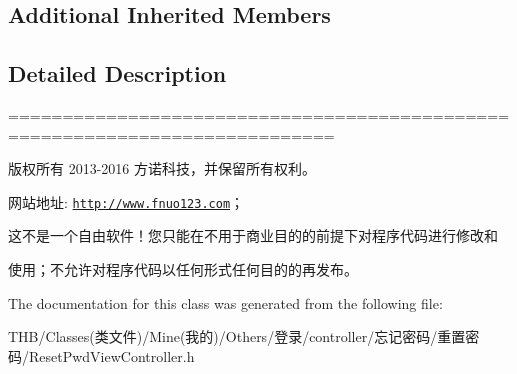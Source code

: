 \subsection*{Additional Inherited Members}


\subsection{Detailed Description}
============================================================================

版权所有 2013-\/2016 方诺科技，并保留所有权利。

网站地址\+: \href{http://www.fnuo123.com}{\tt http\+://www.\+fnuo123.\+com}； 



这不是一个自由软件！您只能在不用于商业目的的前提下对程序代码进行修改和

使用；不允许对程序代码以任何形式任何目的的再发布。 

 

The documentation for this class was generated from the following file\+:\begin{DoxyCompactItemize}
\item 
T\+H\+B/\+Classes(类文件)/\+Mine(我的)/\+Others/登录/controller/忘记密码/重置密码/Reset\+Pwd\+View\+Controller.\+h\end{DoxyCompactItemize}
